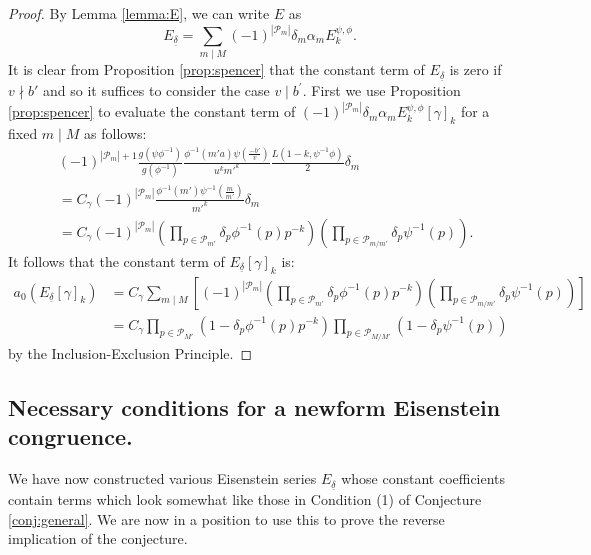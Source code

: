 \documentclass{amsart}
\theoremstyle{plain}
\theoremstyle{definition}
\begin{document}
\begin{proof}
By Lemma \ref{lemma:E}, we can write $E$ as
\begin{equation*}
    E_{\underline{\delta}}=\sum_{m \mid M}(-1)^{|\mathcal{P}_m|} \delta_m \alpha_m E_k^{\psi,\phi}.
\end{equation*}
It is clear from Proposition \ref{prop:spencer} that the constant term of $E_{\underline{\delta}}$ is zero if $v\nmid b'$ and so it suffices to consider the case $v \mid b^\prime$. First we use Proposition \ref{prop:spencer} to evaluate the constant term of $(-1)^{|\mathcal{P}_m|}\delta_m \alpha_m E_k^{\psi, \phi}[\gamma]_k$ for a fixed $m \mid M$ as follows:
\begin{align*}
    &(-1)^{|\mathcal{P}_m| +1}\frac{g(\psi \phi^{-1})}{g(\phi^{-1})} \frac{\phi^{-1}\left(m' a \right)\psi \left(\frac{-b'}{v}\right)}{u^k m'^k} \frac{L(1-k, \psi^{-1}\phi)}{2} \delta_m \\
    &= C_{\gamma} (-1)^{|\mathcal{P}_m|} \frac{\phi^{-1}(m')\psi^{-1}\left(\frac{m}{m'}\right)}{m'^k} \delta_m\\ &=  C_{\gamma} (-1)^{|\mathcal{P}_m|} \left(\prod_{p\in \mathcal{P}_{m'}} \delta_p\phi^{-1}(p)p^{-k} \right) \left( \prod_{p \in \mathcal{P}_{m/m'}} \delta_p\psi^{-1}(p) \right).\label{eq:constant}
\end{align*}
It follows that the constant term of $E_{\underline{\delta}}[\gamma]_k$ is:
\begin{align*}
    a_0(E_{\underline{\delta}}[\gamma]_k) &=C_{\gamma} \sum_{m \mid M} \left[ (-1)^{|\mathcal{P}_m|} \left(\prod_{p\in \mathcal{P}_{m'}} \delta_p\phi^{-1}(p)p^{-k}\right) \left( \prod_{p \in \mathcal{P}_{m/m'}} \delta_p\psi^{-1}(p) \right)\right] \\
    &= C_{\gamma} \prod_{p \in \mathcal{P}_{M'}} (1-\delta_p\phi^{-1}(p)p^{-k})  \prod_{p \in \mathcal{P}_{M/M'}} (1-\delta_p\psi^{-1}(p))
\end{align*}
by the Inclusion-Exclusion Principle.
\end{proof}

\subsection{Necessary conditions for a newform Eisenstein congruence.}
We have now constructed various Eisenstein series $E_{\underline{\delta}}$ whose constant coefficients contain terms which look somewhat like those in Condition (1) of Conjecture \ref{conj:general}. We are now in a position to use this to prove the reverse implication of the conjecture.
\end{document}
